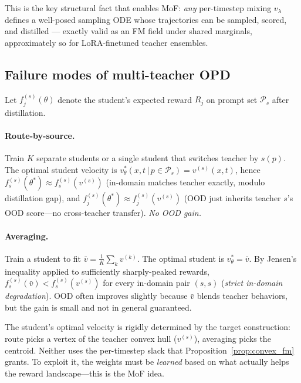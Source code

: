 \documentclass[11pt,a4paper]{article}
\theoremstyle{definition}
\begin{document}
This is the key structural fact that enables MoF: \emph{any} per-timestep
mixing $v_\lambda$ defines a well-posed sampling ODE whose trajectories can
be sampled, scored, and distilled — exactly valid as an FM field under
shared marginals, approximately so for LoRA-finetuned teacher ensembles.

\subsection{Failure modes of multi-teacher OPD}
\label{ssec:opd_failures}

Let $f_j^{(s)}(\theta)$ denote the student's expected reward $R_j$ on
prompt set $\mathcal{P}_s$ after distillation.

\paragraph{Route-by-source.}
Train $K$ separate students or a single student that switches teacher by
$s(p)$. The optimal student velocity is
$v_\theta^*(x,t\,|\,p\in\mathcal{P}_s) = v^{(s)}(x,t)$, hence
$f_s^{(s)}(\theta^*) \approx f_s^{(s)}(v^{(s)})$ (in-domain matches teacher
exactly, modulo distillation gap), and
$f_j^{(s)}(\theta^*) \approx f_j^{(s)}(v^{(s)})$ (OOD just inherits
teacher $s$'s OOD score---no cross-teacher transfer). \emph{No OOD gain.}

\paragraph{Averaging.}
Train a student to fit $\bar v = \tfrac{1}{K}\sum_k v^{(k)}$. The optimal
student is $v_\theta^* = \bar v$. By Jensen's inequality applied to
sufficiently sharply-peaked rewards,
$f_s^{(s)}(\bar v) < f_s^{(s)}(v^{(s)})$ for every in-domain pair $(s,s)$
(\emph{strict in-domain degradation}). OOD often improves slightly because
$\bar v$ blends teacher behaviors, but the gain is small and not in
general guaranteed.

\medskip

\begin{tcolorbox}[colback=red!5,colframe=red!50,title=Both failure modes
share a structural cause]
The student's optimal velocity is rigidly determined by the target
construction: route picks a vertex of the teacher convex hull
($v^{(s)}$), averaging picks the centroid. Neither uses the per-timestep
slack that Proposition~\ref{prop:convex_fm} grants. To exploit it, the
weights must be \emph{learned} based on what actually helps the reward
landscape---this is the MoF idea.
\end{tcolorbox}
\end{document}
